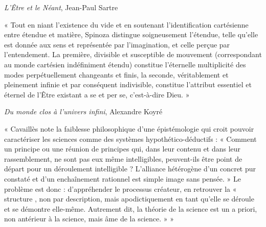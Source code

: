 \documentclass{article}
\begin{document}
\begin{flushright}\textit{L’Être et le Néant}, Jean-Paul Sartre\end{flushright}
\vspace{8pt}
\begin{center} « Tout en niant l’existence du vide et en soutenant l’identification cartésienne entre étendue et matière, Spinoza distingue soigneusement l’étendue, telle qu’elle est donnée aux sens et représentée par l’imagination, et celle perçue par l’entendement. La première, divisible et susceptible de mouvement (correspondant au monde cartésien indéfiniment étendu) constitue l’éternelle multiplicité des modes perpétuellement changeants et finis, la seconde, véritablement et pleinement infinie et par conséquent indivisible, constitue l’attribut essentiel et éternel de l’Être existant a se et per se, c’est-à-dire Dieu. » \end{center} 

\begin{flushright}\textit{Du monde clos à l’univers infini}, Alexandre Koyré\end{flushright}
\vspace{8pt}
\begin{center} « Cavaillès note la faiblesse philosophique d’une épistémologie qui croit pouvoir caractériser les sciences comme des systèmes hypothético-déductifs : « Comment un principe ou une réunion de principes qui, dans leur contenu et dans leur rassemblement, ne sont pas eux même intelligibles, peuvent-ils être point de départ pour un déroulement intelligible ? L’alliance hétérogène d’un concret pur constaté et d’un enchaînement rationnel est simple image sans pensée. » 
	Le problème est donc : d’appréhender le processus créateur, en retrouver la « structure , non par description, mais apodictiquement en tant qu’elle se déroule et se démontre elle-même. Autrement dit, la théorie de la science est un a priori, non antérieur à la science, mais âme de la science. » » \end{center} 
	
\end{document}
